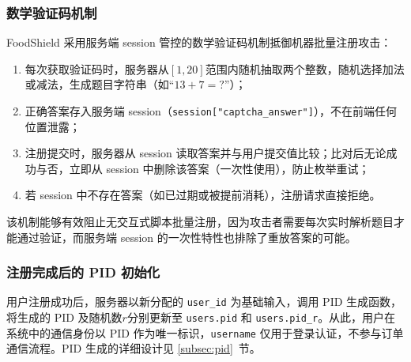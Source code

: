 \subsubsection*{数学验证码机制}

FoodShield 采用服务端 session 管控的数学验证码机制抵御机器批量注册攻击：

\begin{enumerate}[label=\arabic*., leftmargin=2em]
  \item 每次获取验证码时，服务器从$[1, 20]$范围内随机抽取两个整数，随机选择加法或减法，生成题目字符串（如“$13 + 7 = ?$”）；
  \item 正确答案存入服务端 session（\texttt{session["captcha\_answer"]}），不在前端任何位置泄露；
  \item 注册提交时，服务器从 session 读取答案并与用户提交值比较；比对后无论成功与否，立即从 session 中删除该答案（一次性使用），防止枚举重试；
  \item 若 session 中不存在答案（如已过期或被提前消耗），注册请求直接拒绝。
\end{enumerate}

该机制能够有效阻止无交互式脚本批量注册，因为攻击者需要每次实时解析题目才能通过验证，而服务端 session 的一次性特性也排除了重放答案的可能。

\subsubsection*{注册完成后的 PID 初始化}

用户注册成功后，服务器以新分配的 \texttt{user\_id} 为基础输入，调用 PID 生成函数，将生成的 PID 及随机数$r$分别更新至 \texttt{users.pid} 和 \texttt{users.pid\_r}。从此，用户在系统中的通信身份以 PID 作为唯一标识，\texttt{username} 仅用于登录认证，不参与订单通信流程。PID 生成的详细设计见 \ref{subsec:pid}~节。
